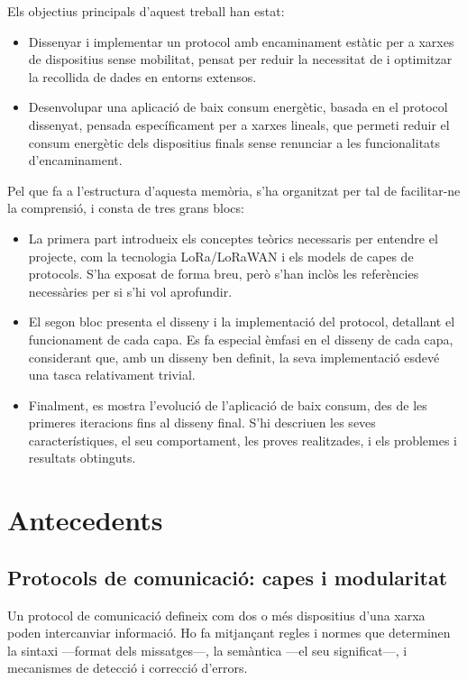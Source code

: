 \documentclass{tfgitic}[2024/07/01]
\begin{document}
Els objectius principals d'aquest treball han estat:
\begin{itemize}
    \item Dissenyar i implementar un protocol amb encaminament estàtic per a xarxes de dispositius sense mobilitat, pensat per reduir la necessitat de  i optimitzar la recollida de dades en entorns extensos.
    \item Desenvolupar una aplicació de baix consum energètic, basada en el protocol dissenyat, pensada específicament per a xarxes lineals, que permeti reduir el consum energètic dels dispositius finals sense renunciar a les funcionalitats d'encaminament.
\end{itemize}

Pel que fa a l'estructura d'aquesta memòria, s'ha organitzat per tal de facilitar-ne la comprensió, i consta de tres grans blocs:
\begin{itemize}
    \item La primera part introdueix els conceptes teòrics necessaris per entendre el projecte, com la tecnologia LoRa/LoRaWAN i els models de capes de protocols. S'ha exposat de forma breu, però s'han inclòs les referències necessàries per si s'hi vol aprofundir.
    \item El segon bloc presenta el disseny i la implementació del protocol, detallant el funcionament de cada capa. Es fa especial èmfasi en el disseny de cada capa, considerant que, amb un disseny ben definit, la seva implementació esdevé una tasca relativament trivial.
    \item Finalment, es mostra l'evolució de l'aplicació de baix consum, des de les primeres iteracions fins al disseny final. S'hi descriuen les seves característiques, el seu comportament, les proves realitzades, i els problemes i resultats obtinguts.
\end{itemize}


\chapter{Antecedents}
\section{Protocols de comunicació: capes i modularitat}
\label{sec:protocols}
Un protocol de comunicació defineix com dos o més dispositius d'una xarxa poden intercanviar informació. Ho fa mitjançant regles i normes que determinen la sintaxi ---format dels missatges---, la semàntica ---el seu significat---, i mecanismes de detecció i correcció d'errors.
\end{document}

